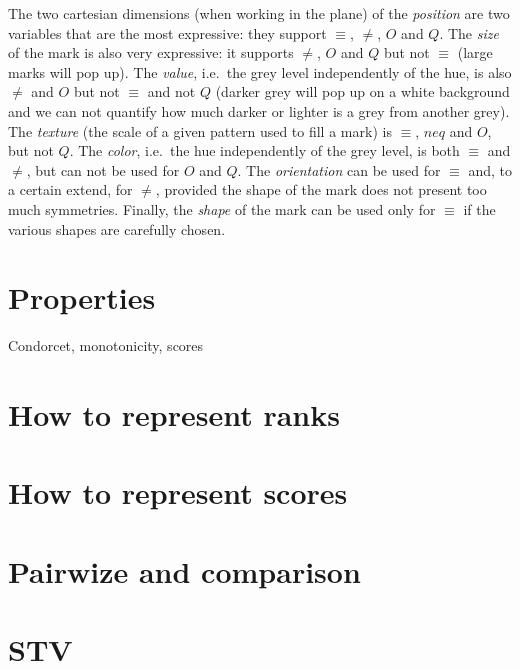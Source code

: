 \documentclass[version=last, pagesize, twoside=off, bibliography=totoc, DIV=calc, fontsize=12pt, a4paper, french, english]{scrartcl}
\begin{document}
The two cartesian dimensions (when working in the plane) of the \emph{position} are two variables that are the most expressive: they support $\equiv$, $\neq$, $O$ and $Q$.
The \emph{size} of the mark is also very expressive: it supports $\neq$, $O$ and $Q$ but not $\equiv$ (large marks will pop up).
The \emph{value}, i.e.\ the grey level independently of the hue, is also $\neq$ and $O$ but not $\equiv$ and not $Q$ (darker grey will pop up on a white background and we can not quantify how much darker or lighter is a grey from another grey).
The \emph{texture} (the scale of a given pattern used to fill a mark) is $\equiv$, $neq$ and $O$, but not $Q$.
The \emph{color}, i.e.\ the hue independently of the grey level, is both $\equiv$ and $\neq$, but can not be used for $O$ and $Q$.
The \emph{orientation} can be used for $\equiv$ and, to a certain extend, for $\neq$, provided the shape of the mark does not present too much symmetries.
Finally, the \emph{shape} of the mark can be used only for $\equiv$ if the various shapes are carefully chosen.


\section{Properties}
Condorcet, monotonicity, scores
\section{How to represent ranks}
\section{How to represent scores}
\section{Pairwize and comparison}
\section{STV}


\end{document}
